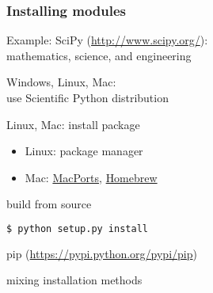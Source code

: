 \begin{frame}[fragile]
\frametitle{Installing modules}

Example: SciPy (\url{http://www.scipy.org/}):\\
mathematics, science, and engineering

\begin{description}
\item<2->[Easy way:] Windows, Linux, Mac:\\
use Scientific Python distribution
\item<3->[Intermediate:] Linux, Mac: install package\\
\begin{itemize}
\item Linux: package manager
\item Mac: \href{https://www.macports.org/}{MacPorts}, \href{http://brew.sh/}{Homebrew}
\end{itemize}
\item<4->[Harder:] build from source
\begin{lstlisting}[language=bash]
 $ python setup.py install
\end{lstlisting}
\item<5->[Better:] pip (\url{https://pypi.python.org/pypi/pip})
\item<6->[Avoid:] mixing installation methods

\end{description}

\end{frame}



